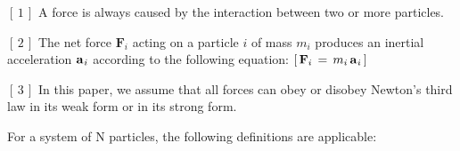 \documentclass[10pt]{article}
\begin{document}
\par \bigskip\smallskip \noindent $[\,1\,]$ A force is always caused by the interaction between two or more particles.

\par \bigskip \noindent $[\,2\,]$ The net force ${\mathbf{F}}_i$ acting on a particle $i$ of mass $m_i$ produces an inertial acceleration ${\mathbf{a}}_{\hspace{+0.045em}i}$ according to the following equation: $[ \, {\mathbf{F}}_i \,=\, m_i \, {\mathbf{a}}_{\hspace{+0.045em}i} \, ]$

\par \bigskip \noindent $[\,3\,]$ In this paper, we assume that all forces can obey or disobey Newton's third law in its weak form or in its strong form.

\newpage

\par {}

\par \bigskip \noindent For a system of N particles, the following definitions are applicable:
\end{document}
